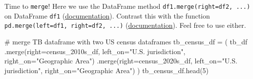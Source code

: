 \documentclass[
  letterpaper,
  DIV=11,
  numbers=noendperiod]{scrreprt}
\newenvironment{Shaded}{\begin{snugshade}}{\end{snugshade}}
\newcommand{\CommentTok}[1]{\textcolor[rgb]{0.37,0.37,0.37}{#1}}
\newcommand{\DecValTok}[1]{\textcolor[rgb]{0.68,0.00,0.00}{#1}}
\newcommand{\NormalTok}[1]{\textcolor[rgb]{0.00,0.23,0.31}{#1}}
\newcommand{\OperatorTok}[1]{\textcolor[rgb]{0.37,0.37,0.37}{#1}}
\newcommand{\StringTok}[1]{\textcolor[rgb]{0.13,0.47,0.30}{#1}}
\begin{document}
Time to \texttt{merge}! Here we use the DataFrame method
\texttt{df1.merge(right=df2,\ ...)} on DataFrame \texttt{df1}
(\href{https://pandas.pydata.org/docs/reference/api/pandas.DataFrame.merge.html}{documentation}).
Contrast this with the function
\texttt{pd.merge(left=df1,\ right=df2,\ ...)}
(\href{https://pandas.pydata.org/docs/reference/api/pandas.merge.html?highlight=pandas\%20merge\#pandas.merge}{documentation}).
Feel free to use either.

\begin{Shaded}
\begin{Highlighting}[]
\CommentTok{\# merge TB dataframe with two US census dataframes}
\NormalTok{tb\_census\_df }\OperatorTok{=}\NormalTok{ (}
\NormalTok{    tb\_df}
\NormalTok{    .merge(right}\OperatorTok{=}\NormalTok{census\_2010s\_df,}
\NormalTok{           left\_on}\OperatorTok{=}\StringTok{"U.S. jurisdiction"}\NormalTok{, right\_on}\OperatorTok{=}\StringTok{"Geographic Area"}\NormalTok{)}
\NormalTok{    .merge(right}\OperatorTok{=}\NormalTok{census\_2020s\_df,}
\NormalTok{           left\_on}\OperatorTok{=}\StringTok{"U.S. jurisdiction"}\NormalTok{, right\_on}\OperatorTok{=}\StringTok{"Geographic Area"}\NormalTok{)}
\NormalTok{)}
\NormalTok{tb\_census\_df.head(}\DecValTok{5}\NormalTok{)}
\end{Highlighting}
\end{Shaded}
\end{document}
